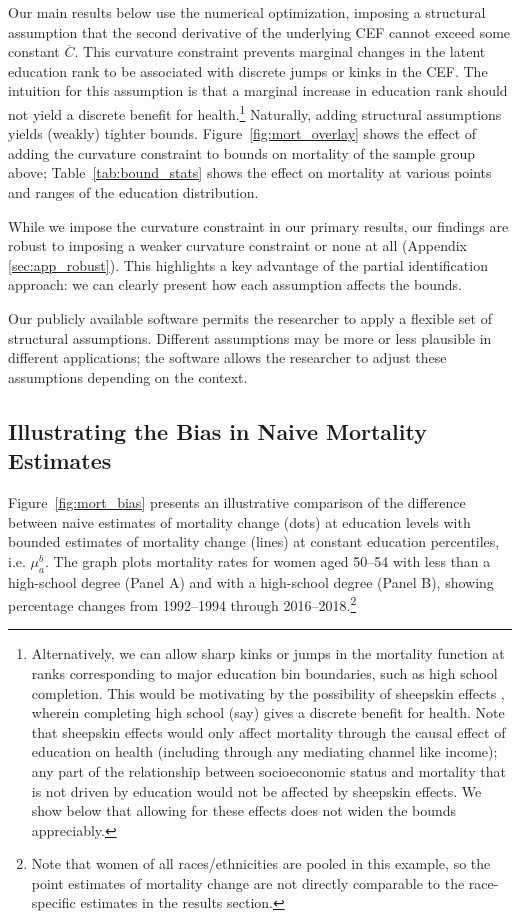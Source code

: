 \documentclass[12pt,letterpaper]{article}
\numberwithin{equation}{section}
\begin{document}
Our main results below use the numerical optimization, imposing a structural assumption that the second derivative of the underlying CEF cannot exceed some constant $\overline{C}$. This curvature constraint prevents marginal changes in the latent education rank to be associated with discrete jumps or kinks in the CEF. The intuition for this assumption is that a marginal increase in education rank should not yield a discrete benefit for health.\footnote{Alternatively, we can allow sharp kinks or jumps in the mortality function at ranks corresponding to major education bin boundaries, such as high school completion. This would be motivating by the possibility of sheepskin effects \citep{hungerford1987}, wherein completing high school (say) gives a discrete benefit for health. Note that sheepskin effects would only affect mortality through the causal effect of education on health (including through any mediating channel like income); any part of the relationship between socioeconomic status and mortality that is not driven by education would not be affected by sheepskin effects. We show below that allowing for these effects does not widen the bounds appreciably.} Naturally, adding structural assumptions yields (weakly) tighter bounds. Figure~\ref{fig:mort_overlay} shows the effect of adding the curvature constraint to bounds on mortality of the sample group above; Table~\ref{tab:bound_stats} shows the effect on mortality at various points and ranges of the education distribution.

While we impose the curvature constraint in our primary results, our findings are robust to imposing a weaker curvature constraint or none at all (Appendix \ref{sec:app_robust}). This highlights a key advantage of the partial identification approach: we can clearly present how each assumption affects the bounds.

Our publicly available software permits the researcher to apply a flexible set of structural assumptions. Different assumptions may be more or less plausible in different applications; the software allows the researcher to adjust these assumptions depending on the context.

\subsection{Illustrating the Bias in Naive Mortality Estimates} 
\label{sec:bias}

Figure~\ref{fig:mort_bias} presents an illustrative comparison of the difference between naive estimates of mortality change (dots) at education levels with bounded estimates of mortality change (lines) at constant education percentiles, i.e. $\mu_a^b$. The graph plots mortality rates for women aged 50--54 with less than a high-school degree (Panel A) and with a high-school degree (Panel B), showing percentage changes from 1992--1994 through 2016--2018.\footnote{Note that women of all races/ethnicities are pooled in this example, so the point estimates of mortality change are not directly comparable to the race-specific estimates in the results section.} 
\end{document}
